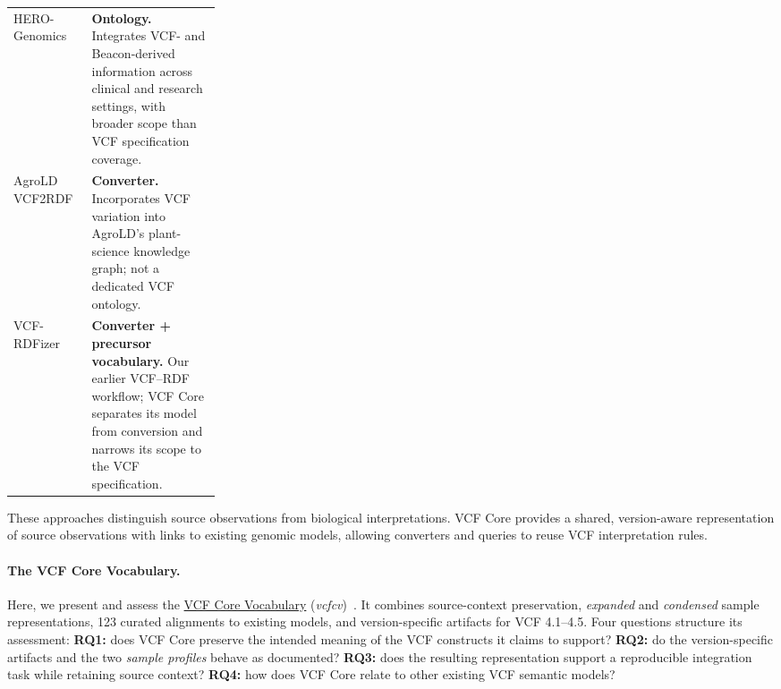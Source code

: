 \begin{table}[htbp]
\begin{tabularx}{\linewidth}{@{}>{\raggedright\arraybackslash}p{0.27\linewidth}>{\raggedright\arraybackslash}X@{}}
HERO-Genomics~\cite{cazzaro2025hero}
& \textbf{Ontology.} Integrates VCF- and Beacon-derived information across clinical and research settings, with broader scope than VCF specification coverage.
\\
AgroLD VCF2RDF~\cite{larmande2025agrold}
& \textbf{Converter.} Incorporates VCF variation into AgroLD's plant-science knowledge graph; not a dedicated VCF ontology.
\\
VCF-RDFizer~\cite{crum2025semantifying}
& \textbf{Converter + precursor vocabulary.} Our earlier VCF--RDF workflow; VCF Core separates its model from conversion and narrows its scope to the VCF specification.
\\
\bottomrule
\end{tabularx}
\end{table}


These approaches distinguish source observations from biological interpretations.
VCF Core provides a shared, version-aware representation of source observations with links to existing genomic models, allowing converters and queries to reuse VCF interpretation rules.

\paragraph{The VCF Core Vocabulary.}
Here, we present and assess the \href{https://ecrum19.github.io/vcf-core-vocabulary/}{VCF Core Vocabulary} (\textit{vcfcv})~\cite{vcfc210}.
It combines source-context preservation, \textit{expanded} and \textit{condensed} sample representations, 123 curated alignments to existing models, and version-specific artifacts for VCF 4.1--4.5.
Four questions structure its assessment: 
\textbf{RQ1:} does VCF Core preserve the intended meaning of the VCF constructs it claims to support?
\textbf{RQ2:} do the version-specific artifacts and the two \emph{sample profiles} behave as documented?
\textbf{RQ3:} does the resulting representation support a reproducible integration task while retaining source context?
\textbf{RQ4:} how does VCF Core relate to other existing VCF semantic models?

